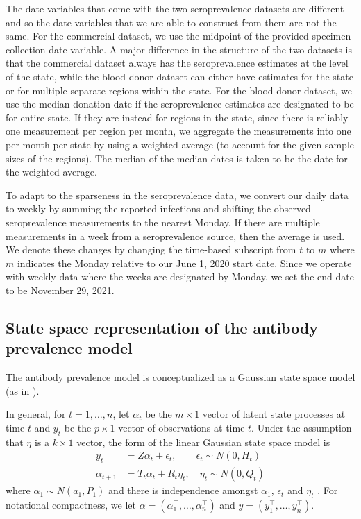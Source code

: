 The date variables that come with the two seroprevalence datasets are different
and so the date variables that we are able to construct from them are not the
same. For the commercial dataset, we use the midpoint of the provided specimen
collection date variable. A major difference in the structure of the two
datasets is that the commercial dataset always has the seroprevalence estimates
at the level of the state, while the blood donor dataset can either have
estimates for the state or for multiple separate regions within the state. For
the blood donor dataset, we use the median donation date if the seroprevalence
estimates are designated to be for entire state. If they are instead for regions
in the state, since there is reliably one measurement per region per month, we
aggregate the measurements into one per month per state by using a weighted
average (to account for the given sample sizes of the regions). The median of
the median dates is taken to be the date for the weighted average.

To adapt to the sparseness in the seroprevalence data, we convert our daily data
to weekly by summing the reported infections and shifting the observed
seroprevalence measurements to the nearest Monday. If there are multiple
measurements in a week from a seroprevalence source, then the average is used.
We denote these changes by changing the time-based subscript from $t$ to $m$
where $m$ indicates the Monday relative to our June 1, 2020 start date.
Since we operate with weekly data where the weeks are designated by Monday, we set the 
end date to be November 29, 2021. 

\subsection{State space representation of the antibody prevalence model}\label{supp:ssapm} 

The antibody prevalence model is conceptualized
as a Gaussian state space model (as in \citealp{durbin2012time, helske2017kfas}).

In general, for $t = 1, \dots, n$, let $\alpha_t$ be the $m \times 1$ vector of
latent state processes at time $t$ and $y_t$ be the $p \times 1$ vector of
observations at time $t$. Under the assumption that $\eta$ is a $k \times 1$
vector, the form of the linear Gaussian state space model is 
\begin{align}
y_t &= Z\alpha_t + \epsilon_t, \qquad \epsilon_t \sim N(0, H_t) \label{eq:ss1}\\
\alpha_{t+1} &= T_t\alpha_t + R_t\eta_t, \quad \eta_t \sim N(0, Q_t) \label{eq:ss2}
\end{align}
where $\alpha_1 \sim N(a_1, P_1)$ and 
there is independence amongst $\alpha_1$, $\epsilon_t$ and $\eta_t$
\citep{helske2017kfas, durbin2012time}. For notational
compactness, we let $\alpha = \left ( \alpha_1^\top, \dots, \alpha_n^\top \right )$
and $y = \left ( y_1^\top, \dots, y_n^\top \right )$.


